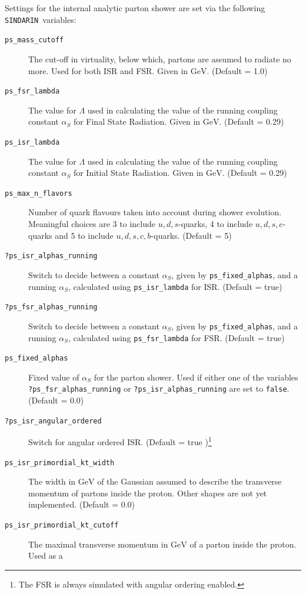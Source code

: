 \documentclass[12pt]{book}
\newcommand{\ttt}[1]{\texttt{#1}}
\newcommand{\sindarin}{\ttt{SINDARIN}}
\begin{document}
Settings for the internal analytic parton shower are set via the following \sindarin\ variables:\\[2ex]
\begin{description}
\item[\ttt{ps\_mass\_cutoff}] The cut-off in virtuality, below
  which, partons are assumed to radiate no more. Used for both ISR and
  FSR. Given in $\mbox{GeV}$. (Default = 1.0)
\item[\ttt{ps\_fsr\_lambda}] The value for $\Lambda$ used in
  calculating the value of the running coupling constant $\alpha_S$
  for Final State Radiation. Given in $\mbox{GeV}$. (Default = 0.29)
\item[\ttt{ps\_isr\_lambda}] The value for $\Lambda$ used in
  calculating the value of the running coupling constant $\alpha_S$
  for Initial State Radiation. Given in $\mbox{GeV}$. (Default = 0.29)
\item[\ttt{ps\_max\_n\_flavors}] Number of quark flavours taken
  into account during shower evolution. Meaningful choices are 3 to
  include $u,d,s$-quarks, 4 to include $u,d,s,c$-quarks and 5 to
  include $u,d,s,c,b$-quarks. (Default = 5)
\item[\ttt{?ps\_isr\_alphas\_running}] Switch to decide between a
  constant $\alpha_S$, given by \ttt{ps\_fixed\_alphas}, and a
  running $\alpha_S$, calculated using \ttt{ps\_isr\_lambda} for
  ISR. (Default = true)
\item[\ttt{?ps\_fsr\_alphas\_running}] Switch to decide between a
  constant $\alpha_S$, given by \ttt{ps\_fixed\_alphas}, and a
  running $\alpha_S$, calculated using \ttt{ps\_fsr\_lambda} for
  FSR. (Default = true)
\item[\ttt{ps\_fixed\_alphas}] Fixed value of $\alpha_S$ for the
  parton shower. Used if either one of the variables
  \ttt{?ps\_fsr\_alphas\_running}
  or \ttt{?ps\_isr\_alphas\_running} are set to
  \verb|false|. (Default = 0.0)
\item[\ttt{?ps\_isr\_angular\_ordered}] Switch for angular ordered
  ISR. (Default = true )\footnote{The FSR is always simulated with
    angular ordering enabled.}
\item[\ttt{ps\_isr\_primordial\_kt\_width}] The width in
  $\mbox{GeV}$ of the Gaussian assumed to describe the transverse
  momentum of partons inside the proton. Other shapes are not yet
  implemented. (Default = 0.0)
\item[\ttt{ps\_isr\_primordial\_kt\_cutoff}] The maximal transverse
  momentum in $\mbox{GeV}$ of a parton inside the proton. Used as a

\end{description}
\end{document}
